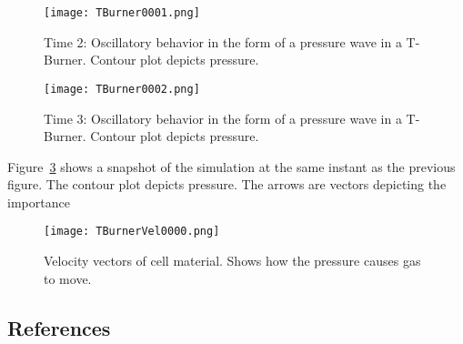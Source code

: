 \begin{figure}
  \center
  \texttt{[image: TBurner0001.png]}

  \caption{Time 2: Oscillatory behavior in the form of a pressure wave in a T-Burner.  Contour plot depicts pressure.}
  \label{figtburn2}
\end{figure}
\begin{figure}
  \center
  \texttt{[image: TBurner0002.png]}

  \caption{Time 3: Oscillatory behavior in the form of a pressure wave in a T-Burner.  Contour plot depicts pressure.}
  \label{figtburn3}
\end{figure}

Figure~\ref{figtburnVel} shows a snapshot of the simulation at the same instant as the 
previous figure.  The contour plot depicts pressure.  The arrows are vectors depicting
the importance   
\begin{figure}
  \center
  \texttt{[image: TBurnerVel0000.png]}

  \caption{Velocity vectors of cell material.  Shows how the pressure causes gas to move.}
  \label{figtburnVel}
\end{figure}

%
\subsection{References}


